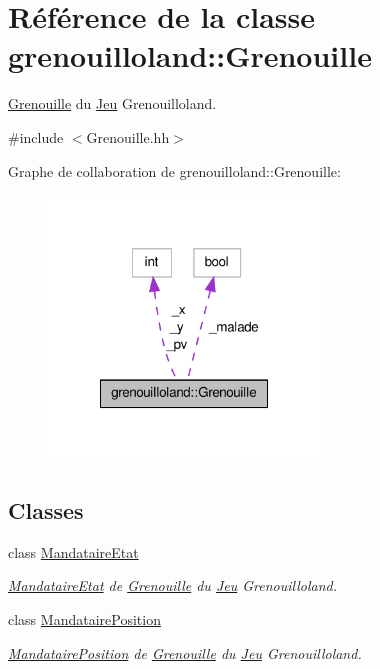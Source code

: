\hypertarget{classgrenouilloland_1_1Grenouille}{\section{Référence de la classe grenouilloland\-:\-:Grenouille}
\label{classgrenouilloland_1_1Grenouille}
}


\hyperlink{classgrenouilloland_1_1Grenouille}{Grenouille} du \hyperlink{classgrenouilloland_1_1Jeu}{Jeu} Grenouilloland.  




{\ttfamily \#include $<$Grenouille.\-hh$>$}



Graphe de collaboration de grenouilloland\-:\-:Grenouille\-:
\nopagebreak
\begin{figure}[H]
\begin{center}
\leavevmode
\includegraphics[width=204pt]{classgrenouilloland_1_1Grenouille__coll__graph}
\end{center}
\end{figure}
\subsection*{Classes}
\begin{DoxyCompactItemize}
\item 
class \hyperlink{classgrenouilloland_1_1Grenouille_1_1MandataireEtat}{Mandataire\-Etat}
\begin{DoxyCompactList}\small\item\em \hyperlink{classgrenouilloland_1_1Grenouille_1_1MandataireEtat}{Mandataire\-Etat} de \hyperlink{classgrenouilloland_1_1Grenouille}{Grenouille} du \hyperlink{classgrenouilloland_1_1Jeu}{Jeu} Grenouilloland. \end{DoxyCompactList}\item 
class \hyperlink{classgrenouilloland_1_1Grenouille_1_1MandatairePosition}{Mandataire\-Position}
\begin{DoxyCompactList}\small\item\em \hyperlink{classgrenouilloland_1_1Grenouille_1_1MandatairePosition}{Mandataire\-Position} de \hyperlink{classgrenouilloland_1_1Grenouille}{Grenouille} du \hyperlink{classgrenouilloland_1_1Jeu}{Jeu} Grenouilloland. \end{DoxyCompactList}\end{DoxyCompactItemize}
